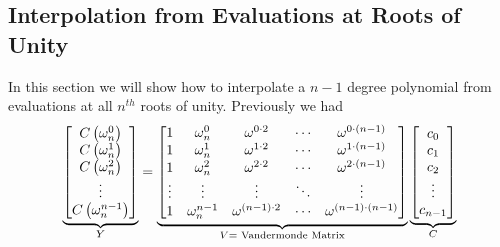  \subsection{Interpolation from Evaluations at Roots of Unity}In this section we will show how to interpolate a $n-1$ degree polynomial from evaluations at all $n^{th}$ roots of unity. Previously we had $$\underbrace{\left[\begin{matrix}C\left(\omega^0_n\right)\\ C\left(\omega^1_n\right)\\ C\left(\omega^2_n\right)\\ \vdots\\ C\left(\omega^{n-1}_n\right)\end{matrix}\right]}_{Y}=\underbrace{\left[\begin{matrix}1 & \omega^0_n & \omega ^{0\cdot 2}& \cdots & \omega^{0\cdot (n-1)}\\  1 & \omega^1_n & \omega ^{1\cdot 2}& \cdots & \omega^{1\cdot (n-1)}\\ 1 & \omega^2_n & \omega ^{2\cdot 2}& \cdots & \omega^{2\cdot (n-1)}\\ \vdots & \vdots & \vdots & \ddots & \vdots\\ 1 & \omega^{n-1}_n & \omega ^{(n-1)\cdot 2}& \cdots & \omega^{(n-1)\cdot (n-1)}\end{matrix}\right]}_{V=\text{ Vandermonde Matrix}}\underbrace{\left[\begin{matrix}c_0\\ c_1\\ c_2\\ \vdots \\ c_{n-1}\end{matrix}\right]}_{C}$$
 
